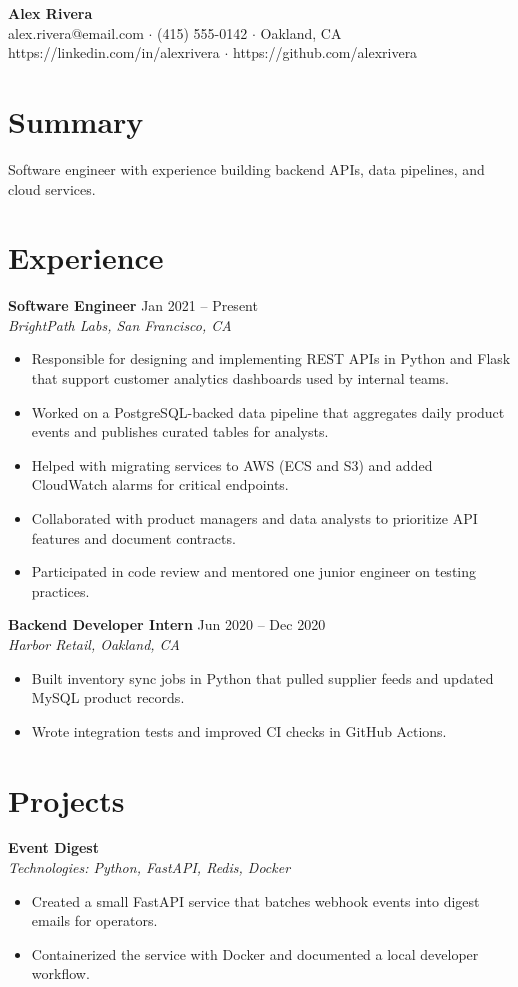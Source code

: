 \documentclass[letterpaper,11pt]{article}
\begin{document}
\begin{center}
{\LARGE\bfseries Alex Rivera}\\[0.3em]
alex.rivera@email.com $\cdot$ (415) 555-0142 $\cdot$ Oakland, CA\\
https://linkedin.com/in/alexrivera $\cdot$ https://github.com/alexrivera
\end{center}

\section*{Summary}
Software engineer with experience building backend APIs, data pipelines, and cloud services.

\section*{Experience}
\textbf{Software Engineer} \hfill Jan 2021 -- Present\\
\textit{BrightPath Labs, San Francisco, CA}
\begin{itemize}
  \item Responsible for designing and implementing REST APIs in Python and Flask that support customer analytics dashboards used by internal teams.
  \item Worked on a PostgreSQL-backed data pipeline that aggregates daily product events and publishes curated tables for analysts.
  \item Helped with migrating services to AWS (ECS and S3) and added CloudWatch alarms for critical endpoints.
  \item Collaborated with product managers and data analysts to prioritize API features and document contracts.
  \item Participated in code review and mentored one junior engineer on testing practices.
\end{itemize}

\textbf{Backend Developer Intern} \hfill Jun 2020 -- Dec 2020\\
\textit{Harbor Retail, Oakland, CA}
\begin{itemize}
  \item Built inventory sync jobs in Python that pulled supplier feeds and updated MySQL product records.
  \item Wrote integration tests and improved CI checks in GitHub Actions.
\end{itemize}

\section*{Projects}
\textbf{Event Digest}\\
\textit{Technologies: Python, FastAPI, Redis, Docker}
\begin{itemize}
  \item Created a small FastAPI service that batches webhook events into digest emails for operators.
  \item Containerized the service with Docker and documented a local developer workflow.
\end{itemize}
\end{document}
